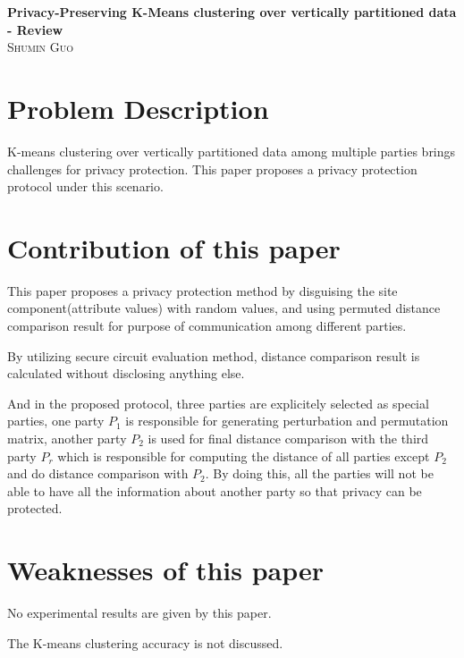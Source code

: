 \documentclass[12pt]{article}
\begin{document}
\begin{center}                  %
\textbf{Privacy-Preserving K-Means clustering over vertically
  partitioned data - Review} \\ 
\small\textsc{Shumin Guo} \\
\end{center}
\section*{Problem Description}

K-means clustering over vertically partitioned data among multiple
parties brings challenges for privacy protection. This paper proposes
a privacy protection protocol under this scenario. 

\section*{Contribution of this paper}
This paper proposes a privacy protection method by disguising the site
component(attribute values) with random values, and using permuted
distance comparison result for purpose of communication among
different parties.  

By utilizing secure circuit evaluation method, distance comparison
result is calculated without disclosing anything else. 

And in the proposed protocol, three parties are explicitely selected as
special parties, one party $P_1$ is responsible for generating perturbation
and permutation matrix, another party $P_2$ is used for final distance
comparison with the third party $P_r$ which is responsible for
computing the distance of all parties except $P_2$ and do distance
comparison with $P_2$. By doing this, all the parties will not be able
to have all the information about another party so that privacy can be
protected. 

\section*{Weaknesses of this paper}
No experimental results are given by this paper. 

The K-means clustering accuracy is not discussed. 
 
 
\end{document}
